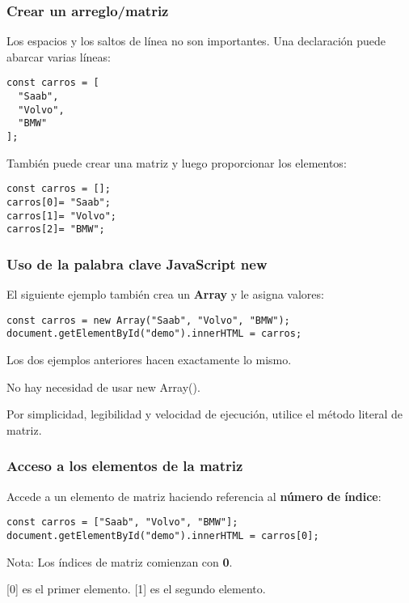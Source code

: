 \begin{frame}[fragile]
  \frametitle{Crear un arreglo/matriz}

  Los espacios y los saltos de línea no son importantes.
  Una declaración puede abarcar varias líneas:

  \vspace{\baselineskip}
  \begin{lstlisting}
const carros = [
  "Saab",
  "Volvo",
  "BMW"
]; 
  \end{lstlisting}

  \vspace{\baselineskip}
  También puede crear una matriz y luego proporcionar los elementos:

  \vspace{\baselineskip}
  \begin{lstlisting}
const carros = [];
carros[0]= "Saab";
carros[1]= "Volvo";
carros[2]= "BMW";
  \end{lstlisting}
\end{frame}

\begin{frame}[fragile]
  \frametitle{Uso de la palabra clave JavaScript new}

  El siguiente ejemplo también crea un \textbf{Array} y le asigna valores:

  \vspace{\baselineskip}
  \begin{lstlisting}
const carros = new Array("Saab", "Volvo", "BMW");
document.getElementById("demo").innerHTML = carros;
  \end{lstlisting}

  \begin{exampleblock}{}
    Los dos ejemplos anteriores hacen exactamente lo mismo.

    \vspace{\baselineskip}
    No hay necesidad de usar new Array().

    \vspace{\baselineskip}
    Por simplicidad, legibilidad y velocidad de ejecución,
    utilice el método literal de matriz.
  \end{exampleblock}
\end{frame}

\begin{frame}[fragile]
  \frametitle{Acceso a los elementos de la matriz}

  Accede a un elemento de matriz haciendo referencia al
  \textbf{número de índice}:

  \vspace{\baselineskip}
  \begin{lstlisting}
const carros = ["Saab", "Volvo", "BMW"];
document.getElementById("demo").innerHTML = carros[0];
  \end{lstlisting}

  \begin{exampleblock}{Nota:}
    Los índices de matriz comienzan con \textbf{0}.

    \vspace{\baselineskip}
    [0] es el primer elemento. [1] es el segundo elemento.
  \end{exampleblock}
\end{frame}

